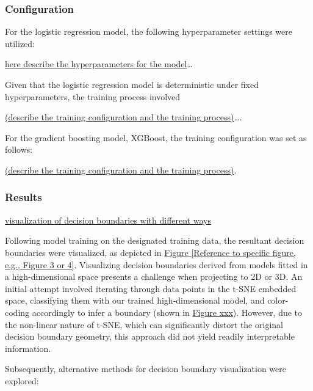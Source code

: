 \documentclass{article}
\begin{document}
\subsubsection*{Configuration}

For the logistic regression model, the following hyperparameter settings were utilized: 

\underline{here describe the hyperparameters for the model}\ldots

Given that the logistic regression model is deterministic under fixed hyperparameters, the training process involved 

\underline{(describe the training configuration and the training process)}\ldots.

For the gradient boosting model, XGBoost, the training configuration was set as follows: 

\underline{(describe the training configuration and the training process)}.

\subsubsection*{Results}



\underline{visualization of decision boundaries with different ways} %

Following model training on the designated training data, the resultant decision boundaries were visualized, as depicted in \underline{Figure [Reference to specific figure, e.g., Figure 3 or 4]}. Visualizing decision boundaries derived from models fitted in a high-dimensional space presents a challenge when projecting to 2D or 3D. An initial attempt involved iterating through data points in the t-SNE embedded space, classifying them with our trained high-dimensional model, and color-coding accordingly to infer a boundary (shown in \underline{Figure xxx}). However, due to the non-linear nature of t-SNE, which can significantly distort the original decision boundary geometry, this approach did not yield readily interpretable information.

Subsequently, alternative methods for decision boundary visualization were explored:
\end{document}
